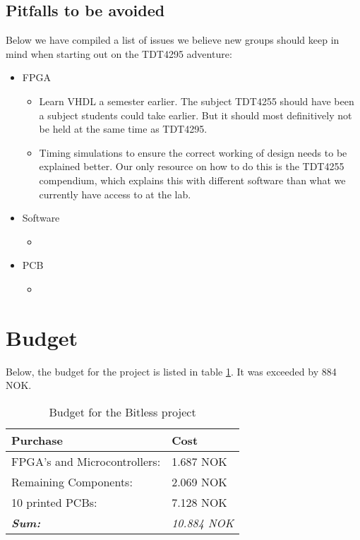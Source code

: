 \subsection{Pitfalls to be avoided}\label{conclusion:pitfalls}
Below we have compiled a list of issues we believe new groups should keep in mind when starting out on the TDT4295 adventure:
\begin{itemize}
	\item FPGA
	\begin{itemize}
		\item Learn VHDL a semester earlier. The subject TDT4255 should have been a subject students could take earlier.
But it should most definitively not be held at the same time as TDT4295.
		\item Timing simulations to ensure the correct working of design needs to be explained better.
Our only resource on how to do this is the TDT4255 compendium\cite{tdt4255-compendium}, which explains this with different software than what we currently have access to at the lab.
	\end{itemize}
	\item Software
	\begin{itemize}
		\item
	\end{itemize}
	\item PCB
	\begin{itemize}
		\item
	\end{itemize}
\end{itemize}

\section{Budget}
Below, the budget for the project is listed in table \ref{tab:budget}.
It was exceeded by 884 NOK.

\begin{table}[H]
	\centering
	\begin{tabular}{|l|l|}
		\hline
		\textbf{Purchase} & \textbf{Cost} \\
		\hline
		\hline
		FPGA's and Microcontrollers: & 1.687 NOK\\
		\hline
		Remaining Components: & 2.069 NOK\\
		\hline
		10 printed PCBs: & 7.128 NOK \\
		\hline
		\hline
		\textbf{\textit{Sum:}} & \textit{10.884 NOK}\\
		\hline
	\end{tabular}
	\caption{Budget for the Bitless project}
	\label{tab:budget}
\end{table}
